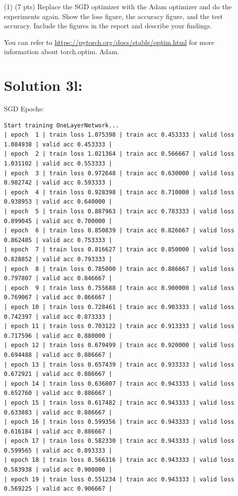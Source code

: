 \documentclass[10pt]{article}
\begin{document}
(1) (7 pts) Replace the SGD optimizer with the Adam optimizer and do the experiments again. Show the loss figure, the accuracy figure, and the test accuracy. Include the figures in the report and describe your findings.

You can refer to \href{https://pytorch.org/docs/stable/optim.html}{https://pytorch.org/docs/stable/optim.html} for more information about torch.optim. Adam.

\section*{Solution 3l:}

SGD Epochs:
\begin{verbatim}
Start training OneLayerNetwork...
| epoch  1 | train loss 1.075398 | train acc 0.453333 | valid loss 1.084938 | valid acc 0.453333 |
| epoch  2 | train loss 1.021364 | train acc 0.566667 | valid loss 1.031102 | valid acc 0.553333 |
| epoch  3 | train loss 0.972648 | train acc 0.630000 | valid loss 0.982742 | valid acc 0.593333 |
| epoch  4 | train loss 0.928398 | train acc 0.710000 | valid loss 0.938953 | valid acc 0.640000 |
| epoch  5 | train loss 0.887963 | train acc 0.783333 | valid loss 0.899045 | valid acc 0.700000 |
| epoch  6 | train loss 0.850839 | train acc 0.826667 | valid loss 0.862485 | valid acc 0.753333 |
| epoch  7 | train loss 0.816627 | train acc 0.850000 | valid loss 0.828852 | valid acc 0.793333 |
| epoch  8 | train loss 0.785000 | train acc 0.886667 | valid loss 0.797807 | valid acc 0.846667 |
| epoch  9 | train loss 0.755688 | train acc 0.900000 | valid loss 0.769067 | valid acc 0.866667 |
| epoch 10 | train loss 0.728461 | train acc 0.903333 | valid loss 0.742397 | valid acc 0.873333 |
| epoch 11 | train loss 0.703122 | train acc 0.913333 | valid loss 0.717596 | valid acc 0.880000 |
| epoch 12 | train loss 0.679499 | train acc 0.920000 | valid loss 0.694488 | valid acc 0.886667 |
| epoch 13 | train loss 0.657439 | train acc 0.933333 | valid loss 0.672921 | valid acc 0.886667 |
| epoch 14 | train loss 0.636807 | train acc 0.943333 | valid loss 0.652760 | valid acc 0.886667 |
| epoch 15 | train loss 0.617482 | train acc 0.943333 | valid loss 0.633883 | valid acc 0.886667 |
| epoch 16 | train loss 0.599356 | train acc 0.943333 | valid loss 0.616184 | valid acc 0.886667 |
| epoch 17 | train loss 0.582330 | train acc 0.943333 | valid loss 0.599565 | valid acc 0.893333 |
| epoch 18 | train loss 0.566316 | train acc 0.943333 | valid loss 0.583938 | valid acc 0.900000 |
| epoch 19 | train loss 0.551234 | train acc 0.943333 | valid loss 0.569225 | valid acc 0.906667 |

\end{verbatim}
\end{document}
